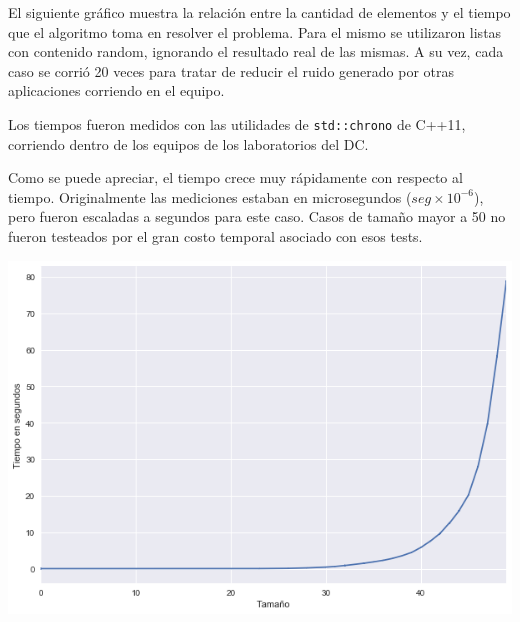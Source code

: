 	El siguiente gráfico muestra la relación entre la cantidad de elementos y el tiempo que el algoritmo toma en resolver el problema. Para el mismo se utilizaron listas con contenido random, ignorando el resultado real de las mismas. A su vez, cada caso se corrió 20 veces para tratar de reducir el ruido generado por otras aplicaciones corriendo en el equipo.

	Los tiempos fueron medidos con las utilidades de \texttt{std::chrono} de C++11, corriendo dentro de los equipos de los laboratorios del DC.

	Como se puede apreciar, el tiempo crece muy rápidamente con respecto al tiempo. Originalmente las mediciones estaban en microsegundos ($seg \times 10^{-6}$), pero fueron escaladas a segundos para este caso. Casos de tamaño mayor a 50 no fueron testeados por el gran costo temporal asociado con esos tests.

	\begin{center}
	\includegraphics[width=.8\textwidth]{ej1.png}
	\end{center}